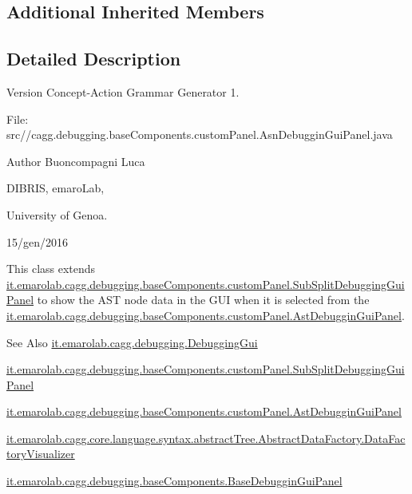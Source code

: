 \subsection*{Additional Inherited Members}


\subsection{Detailed Description}
\begin{DoxyVersion}{Version}
Concept-\/\-Action Grammar Generator 1. \par
 File\-: src//cagg.debugging.\-base\-Components.\-custom\-Panel.\-Asn\-Debuggin\-Gui\-Panel.\-java \par

\end{DoxyVersion}
\begin{DoxyAuthor}{Author}
Buoncompagni Luca \par
 D\-I\-B\-R\-I\-S, emaro\-Lab,\par
 University of Genoa. \par
 15/gen/2016 \par

\end{DoxyAuthor}


This class extends \hyperlink{classit_1_1emarolab_1_1cagg_1_1debugging_1_1baseComponents_1_1customPanel_1_1SubSplitDebuggingGuiPanel}{it.\-emarolab.\-cagg.\-debugging.\-base\-Components.\-custom\-Panel.\-Sub\-Split\-Debugging\-Gui\-Panel} to show the A\-S\-T node data in the G\-U\-I when it is selected from the \hyperlink{classit_1_1emarolab_1_1cagg_1_1debugging_1_1baseComponents_1_1customPanel_1_1AstDebugginGuiPanel}{it.\-emarolab.\-cagg.\-debugging.\-base\-Components.\-custom\-Panel.\-Ast\-Debuggin\-Gui\-Panel}. 

\begin{DoxySeeAlso}{See Also}
\hyperlink{classit_1_1emarolab_1_1cagg_1_1debugging_1_1DebuggingGui}{it.\-emarolab.\-cagg.\-debugging.\-Debugging\-Gui} 

\hyperlink{classit_1_1emarolab_1_1cagg_1_1debugging_1_1baseComponents_1_1customPanel_1_1SubSplitDebuggingGuiPanel}{it.\-emarolab.\-cagg.\-debugging.\-base\-Components.\-custom\-Panel.\-Sub\-Split\-Debugging\-Gui\-Panel} 

\hyperlink{classit_1_1emarolab_1_1cagg_1_1debugging_1_1baseComponents_1_1customPanel_1_1AstDebugginGuiPanel}{it.\-emarolab.\-cagg.\-debugging.\-base\-Components.\-custom\-Panel.\-Ast\-Debuggin\-Gui\-Panel} 

\hyperlink{classit_1_1emarolab_1_1cagg_1_1core_1_1language_1_1syntax_1_1abstractTree_1_1AbstractDataFactory_1_1DataFactoryVisualizer}{it.\-emarolab.\-cagg.\-core.\-language.\-syntax.\-abstract\-Tree.\-Abstract\-Data\-Factory.\-Data\-Factory\-Visualizer} 

\hyperlink{classit_1_1emarolab_1_1cagg_1_1debugging_1_1baseComponents_1_1BaseDebugginGuiPanel}{it.\-emarolab.\-cagg.\-debugging.\-base\-Components.\-Base\-Debuggin\-Gui\-Panel} 
\end{DoxySeeAlso}


